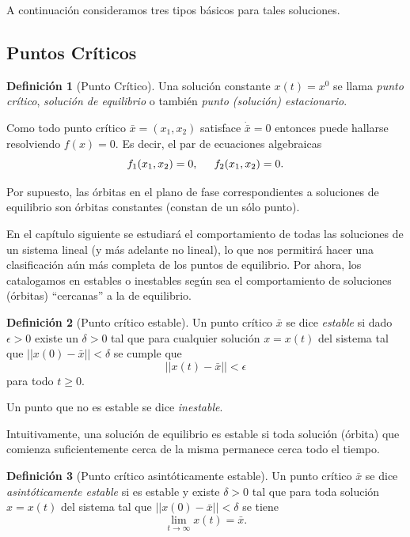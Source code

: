 \documentclass[11pt]{book}
\theoremstyle{definition}
\newtheorem{definition}{Definición}
\numberwithin{definition}{section}
\theoremstyle{theorem}
\numberwithin{theorem}{section}
\numberwithin{lemma}{section}
\numberwithin{corollary}{section}
\theoremstyle{plain}
\numberwithin{example}{section}
\begin{document}
A continuación consideramos tres tipos básicos para tales soluciones.

\subsection{Puntos Críticos}

\begin{definition}[Punto Crítico] Una solución constante $x(t) = x^0$ se llama \emph{punto crítico}, \emph{solución de equilibrio} o también \emph{punto (solución) estacionario}.
\end{definition}

Como todo punto crítico $\bar{x} = (x_1,x_2)$ satisface $\dot{\bar{x}} = 0$ entonces puede hallarse resolviendo $f(x) = 0$. Es decir, el par de ecuaciones algebraicas
$$ f_1(x_1, x_2) = 0, \hspace{0.2in} f_2(x_1, x_2) = 0.$$

Por supuesto, las órbitas en el plano de fase correspondientes a soluciones de equilibrio son órbitas constantes (constan de un sólo punto).

En el capítulo siguiente se estudiará el comportamiento de todas las soluciones de un sistema lineal (y más adelante no lineal), lo que nos permitirá hacer una clasificación aún más completa de los puntos de equilibrio. Por ahora, los catalogamos en estables o inestables según sea el comportamiento de soluciones (órbitas) ``cercanas'' a la de equilibrio.

\begin{definition}[Punto crítico estable]Un punto crítico $\bar{x}$ se dice \emph{estable} si dado $\epsilon > 0$ existe un $\delta > 0$ tal que para cualquier solución $x = x(t)$ del sistema tal que $|| x(0) - \bar{x} || < \delta$ se cumple que
$$ || x(t) - \bar{x} || < \epsilon$$
para todo $t \geq 0$.

Un punto que no es estable se dice \emph{inestable}.
\end{definition}

Intuitivamente, una solución de equilibrio es estable si toda solución (órbita) que comienza suficientemente cerca de la misma permanece cerca todo el tiempo.

\begin{definition}[Punto crítico asintóticamente estable]Un punto crítico $\bar{x}$ se dice \emph{asintóticamente estable} si es estable y existe $\delta > 0$ tal que para toda solución $x = x(t)$ del sistema tal que $|| x(0) - \bar{x} || < \delta$ se tiene $$\lim_{t \to \infty} x(t) = \bar{x}. $$
\end{definition}
\end{document}
